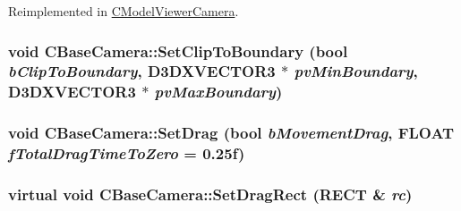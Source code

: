 Reimplemented in \hyperlink{class_c_model_viewer_camera_a64f3b265b831578d24faadec70f9dc1b}{CModelViewerCamera}.\hypertarget{class_c_base_camera_a5e3ec99a05164a281f55a812b755a6da}{
\subsubsection[{SetClipToBoundary}]{\setlength{\rightskip}{0pt plus 5cm}void CBaseCamera::SetClipToBoundary (bool {\em bClipToBoundary}, \/  D3DXVECTOR3 $\ast$ {\em pvMinBoundary}, \/  D3DXVECTOR3 $\ast$ {\em pvMaxBoundary})}}
\label{class_c_base_camera_a5e3ec99a05164a281f55a812b755a6da}
\hypertarget{class_c_base_camera_a029f5a9a3e3555c94e8b88783a9d51f3}{
\subsubsection[{SetDrag}]{\setlength{\rightskip}{0pt plus 5cm}void CBaseCamera::SetDrag (bool {\em bMovementDrag}, \/  FLOAT {\em fTotalDragTimeToZero} = {\ttfamily 0.25f})}}
\label{class_c_base_camera_a029f5a9a3e3555c94e8b88783a9d51f3}
\hypertarget{class_c_base_camera_a8c425184f1114f17bb8e1b3505c13036}{
\subsubsection[{SetDragRect}]{\setlength{\rightskip}{0pt plus 5cm}virtual void CBaseCamera::SetDragRect (RECT \& {\em rc})}}
\label{class_c_base_camera_a8c425184f1114f17bb8e1b3505c13036}



